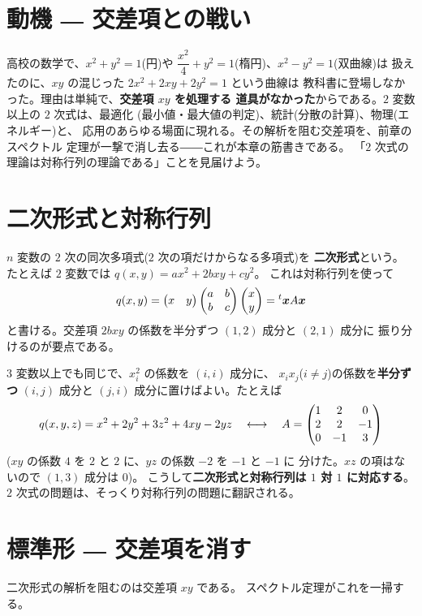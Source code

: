 \section{動機 ― 交差項との戦い}

高校の数学で、$x^2 + y^2 = 1$(円)や
$\dfrac{x^2}{4} + y^2 = 1$(楕円)、$x^2 - y^2 = 1$(双曲線)は
扱えたのに、$xy$ の混じった $2x^2 + 2xy + 2y^2 = 1$ という曲線は
教科書に登場しなかった。理由は単純で、\textbf{交差項 $xy$ を処理する
道具がなかった}からである。$2$ 変数以上の $2$ 次式は、最適化
(最小値・最大値の判定)、統計(分散の計算)、物理(エネルギー)と、
応用のあらゆる場面に現れる。その解析を阻む交差項を、前章のスペクトル
定理が一撃で消し去る――これが本章の筋書きである。
「$2$ 次式の理論は対称行列の理論である」ことを見届けよう。

\section{二次形式と対称行列}

\begin{teigi}[二次形式]\label{def:quad}
$n$ 変数の $2$ 次の同次多項式($2$ 次の項だけからなる多項式)を
\textbf{二次形式}という。
たとえば $2$ 変数では $q(x, y) = ax^2 + 2bxy + cy^2$。
これは対称行列を使って
\[
q(x, y) = \begin{pmatrix}x & y\end{pmatrix}\begin{pmatrix}a & b \\ b & c\end{pmatrix}\begin{pmatrix}x \\ y\end{pmatrix}
= {}^t\bm{x} A \bm{x}
\]
と書ける。交差項 $2bxy$ の係数を半分ずつ $(1,2)$ 成分と $(2,1)$ 成分に
振り分けるのが要点である。
\end{teigi}

$3$ 変数以上でも同じで、$x_i^2$ の係数を $(i, i)$ 成分に、
$x_ix_j$($i \neq j$)の係数を\textbf{半分ずつ} $(i, j)$ 成分と
$(j, i)$ 成分に置けばよい。たとえば
\[
q(x, y, z) = x^2 + 2y^2 + 3z^2 + 4xy - 2yz
\quad\longleftrightarrow\quad
A = \begin{pmatrix}1 & 2 & 0 \\ 2 & 2 & -1 \\ 0 & -1 & 3\end{pmatrix}
\]
($xy$ の係数 $4$ を $2$ と $2$ に、$yz$ の係数 $-2$ を $-1$ と $-1$ に
分けた。$xz$ の項はないので $(1,3)$ 成分は $0$)。
こうして\textbf{二次形式と対称行列は $1$ 対 $1$ に対応する}。
$2$ 次式の問題は、そっくり対称行列の問題に翻訳される。

\section{標準形 ― 交差項を消す}

二次形式の解析を阻むのは交差項 $xy$ である。
スペクトル定理がこれを一掃する。

